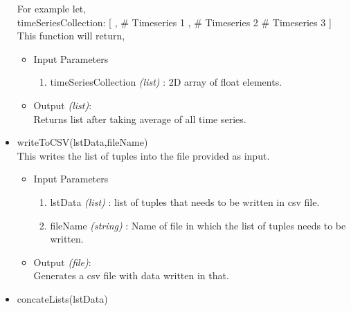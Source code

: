 \begin{itemize}
	For example let,\\
	timeSeriesCollection: [ \newline
	    [1,2,3], \# Timeseries 1 \newline
	    [4,5,6], \# Timeseries 2 \newline
	    [7,8,9] \# Timeseries 3 \newline
	] \newline
	\\
	This function will return,\newline
	[4,5,6] \newline
	
	\begin{itemize}
	  \item Input Parameters
	  
	  \begin{enumerate}
	    \item timeSeriesCollection \textit{(list)} : 2D array of float 
elements.
	  \end{enumerate}

	  \item Output \textit{(list)}: \\
	  Returns list after taking average of all time series.
	  
	\end{itemize}
 
 
 
 \item writeToCSV(lstData,fileName) \\
 
 This writes the list of tuples into the file provided as input.
 \begin{itemize}
	  \item Input Parameters
	  
	  \begin{enumerate}
	    \item lstData \textit{(list)} : list of tuples that needs to be written in csv file.
	    \item fileName \textit{(string)} : Name of file in which the list of tuples needs to be written.
	    \end{enumerate}

	  \item Output \textit{(file)}: \\
	  Generates a csv file with data written in that.
	  
	\end{itemize}

 \item concateLists(lstData) \\
 

\end{itemize}
